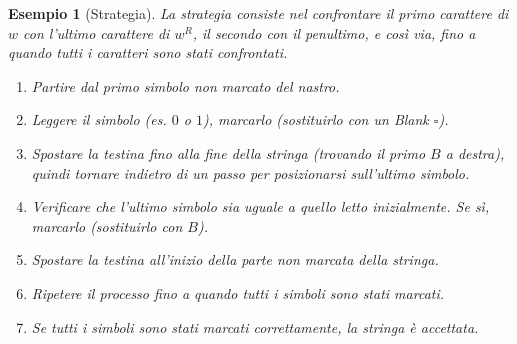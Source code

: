 \documentclass[a4paper]{article}
\newtheorem{example}{Esempio}
\newcommand{\blankS}{\ensuremath{\square}}
\begin{document}
\begin{example}[Strategia]
La strategia consiste nel confrontare il primo carattere di $w$ con l'ultimo carattere di $w^R$, il secondo con il penultimo, e così via, fino a quando tutti i caratteri sono stati confrontati.
\begin{enumerate}
    \item Partire dal primo simbolo non marcato del nastro.
    \item Leggere il simbolo (es. $0$ o $1$), marcarlo (sostituirlo con un Blank $\blankS$).
    \item Spostare la testina fino alla fine della stringa (trovando il primo $B$ a destra), quindi tornare indietro di un passo per posizionarsi sull'ultimo simbolo.
    \item Verificare che l'ultimo simbolo sia uguale a quello letto inizialmente. Se sì, marcarlo (sostituirlo con $B$).
    \item Spostare la testina all'inizio della parte non marcata della stringa.
    \item Ripetere il processo fino a quando tutti i simboli sono stati marcati.
    \item Se tutti i simboli sono stati marcati correttamente, la stringa è accettata.
\end{enumerate}
\end{example}

\end{document}
